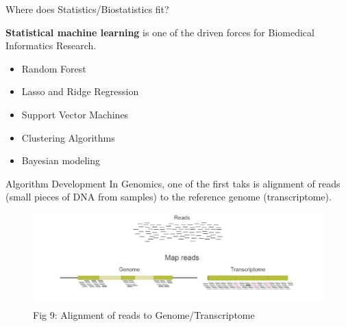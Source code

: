 \documentclass[11pt, aspectratio=43]{beamer}
\begin{document}
	
	\begin{frame}{Where does Statistics/Biostatistics fit?}
		
		{\bf Statistical machine learning} is one of the driven forces for Biomedical Informatics Research. 
		
		\begin{itemize}
			\item Random Forest
			\item Lasso and Ridge Regression
			\item Support Vector Machines
			\item Clustering Algorithms
			\item Bayesian modeling
		\end{itemize}
	\end{frame}
	
	\begin{frame}{Algorithm Development}
		In Genomics, one of the first taks is alignment of reads (small pieces of
		DNA from samples) to the reference genome (transcriptome).
		\begin{figure}[h]
			\centering
			\includegraphics[scale=0.45]{Figures/alignment.png}
			\caption{Fig 9: Alignment of reads to Genome/Transcriptome}
		\end{figure}	
	\end{frame}
	
\end{document}
